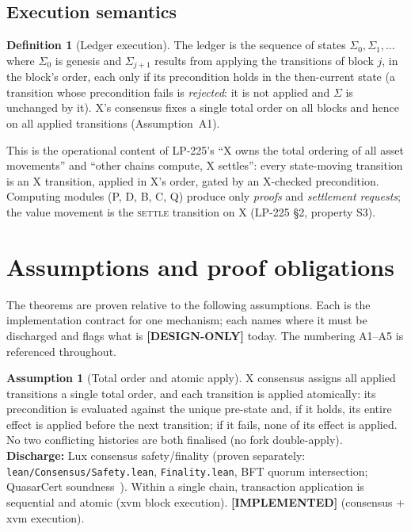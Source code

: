 \documentclass[11pt]{article}
\theoremstyle{definition}
\newtheorem{definition}{Definition}
\newtheorem{assumption}{Assumption}
\theoremstyle{remark}
\newcommand{\IMPL}{\textbf{[IMPLEMENTED]}}
\newcommand{\DESIGN}{\textbf{[DESIGN-ONLY]}}
\begin{document}
\subsection{Execution semantics}
\label{sec:exec}

\begin{definition}[Ledger execution]
\label{def:ledger}
The ledger is the sequence of states $\Sigma_0,\Sigma_1,\dots$ where
$\Sigma_0$ is genesis and $\Sigma_{j+1}$ results from applying the
transitions of block $j$, in the block's order, each only if its
precondition holds in the then-current state (a transition whose
precondition fails is \emph{rejected}: it is not applied and
$\Sigma$ is unchanged by it). X's consensus fixes a single total order on
all blocks and hence on all applied transitions (Assumption~A1).
\end{definition}

This is the operational content of LP-225's ``X owns the total ordering of
all asset movements'' and ``other chains compute, X settles'': every
state-moving transition is an X transition, applied in X's order, gated by
an X-checked precondition. Computing modules (P, D, B, C, Q) produce only
\emph{proofs} and \emph{settlement requests}; the value movement is the
\textsc{settle} transition on X (LP-225 \S2, property S3).

\section{Assumptions and proof obligations}
\label{sec:assumptions}

The theorems are proven relative to the following assumptions. Each is the
implementation contract for one mechanism; each names where it must be
discharged and flags what is \DESIGN{} today. The numbering A1--A5 is
referenced throughout.

\begin{assumption}[Total order and atomic apply]
\label{a:order}
X consensus assigns all applied transitions a single total order, and each
transition is applied atomically: its precondition is evaluated against
the unique pre-state and, if it holds, its entire effect is applied before
the next transition; if it fails, none of its effect is applied. No two
conflicting histories are both finalised (no fork double-apply).
\\\textbf{Discharge:} Lux consensus safety/finality (proven separately:
\texttt{lean/Consensus/Safety.lean}, \texttt{Finality.lean}, BFT quorum
intersection; QuasarCert soundness~\cite{quasarsound}). Within a single
chain, transaction application is sequential and atomic (xvm block
execution). \IMPL{} (consensus + xvm execution).
\end{assumption}
\end{document}
